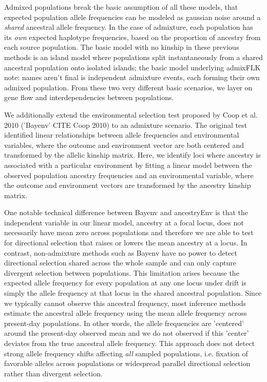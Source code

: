 \documentclass[12pt]{report}
\begin{document}
Admixed populations break the basic assumption of all these models, that expected population allele frequencies can be modeled as gaussian noise around a \textit{shared} ancestral allele frequency. In the case of admixture, each population has its \textit{own} expected haplotype frequencies, based on the proportion of ancestry from each source population. The basic model with no kinship in these previous methods is an island model where populations split instantaneously from a shared ancestral population onto isolated islands; the basic model underlying admixFLK {note: names aren't final} is independent admixture events, each forming their own admixed population. From these two very different basic scenarios, we layer on gene flow and interdependencies between populations. 

We additionally extend the environmental selection test proposed by Coop et al. 2010 ('Bayenv' CITE Coop 2010) to an admixture scenario. The original test identified linear relationships between allele frequencies and environmental variables, where the outcome and environment vector are both centered and transformed by the allelic kinship matrix. Here, we identify loci where ancestry is associated with a particular environment by fitting a linear model between the observed population ancestry frequencies and an environmental variable, where the outcome and environment vectors are transformed by the ancestry kinship matrix.
 
One notable technical difference between Bayenv and ancestryEnv is that the independent variable in our linear model, ancestry at a focal locus, does not necessarily have mean zero across populations and therefore we are able to test for directional selection that raises or lowers the mean ancestry at a locus. In contrast, non-admixture methods such as Bayenv have no power to detect directional selection shared across the whole sample and can only capture divergent selection between populations. This limitation arises because the expected allele frequency for every population at any one locus under drift is simply the allele frequency at that locus in the shared ancestral population. Since we typically cannot observe this ancestral frequency, most inference methods estimate the ancestral allele frequency using the mean allele frequency across present-day populations. In other words, the allele frequencies are 'centered' around the present-day observed mean and we do not observed if this 'center' deviates from the true ancestral allele frequency. This approach does not detect strong allele frequency shifts affecting \textit{all} sampled populations, i.e. fixation of favorable alleles across populations or widespread parallel directional selection rather than divergent selection.
\end{document}
